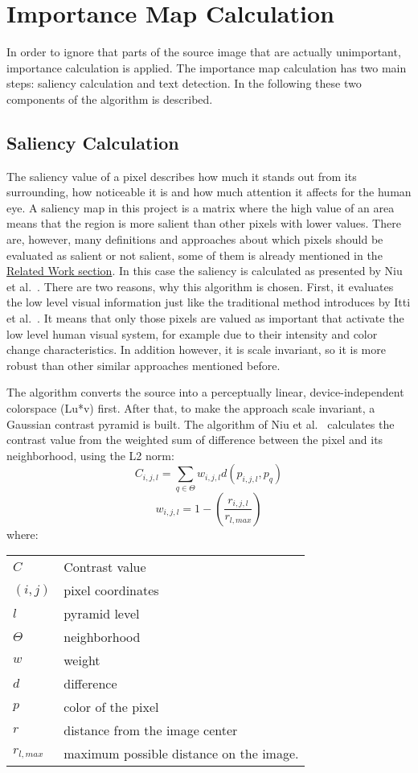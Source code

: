 \documentclass[draft,final]{vutinfth} %
\makeatletter
\newenvironment{conditions}
{\par\vspace{\abovedisplayskip}\noindent\begin{tabular}{>{$}l<{$} @{${}:{}$} l}}
	{\end{tabular}\par\vspace{\belowdisplayskip}}
\makeatother
\begin{document}
	\section{Importance Map Calculation}
	In order to ignore that parts of the source image that are actually unimportant, importance calculation is applied.
	The importance map calculation has two main steps: saliency calculation and text detection.
	In the following these two components of the algorithm is described.
	\subsection{Saliency Calculation}
	The saliency value of a pixel describes how much it stands out from its surrounding, how noticeable it is and how much attention it affects for the human eye.
	A saliency map in this project is a matrix where the high value of an area means that the region is more salient than other pixels with lower values.
	There are, however, many definitions and approaches about which pixels should be evaluated as salient or not salient, some of them is already mentioned in the \hyperref[relatedWork:resampling]{Related Work section}.
	In this case the saliency is calculated as presented by Niu et al.~\cite{niu2012image}. 
	There are two reasons, why this algorithm is chosen.
	First, it evaluates the low level visual information just like the traditional method introduces by Itti et al.~\cite{itti1998model}.
	It means that only those pixels are valued as important that activate the low level human visual system, for example due to their intensity and color change characteristics.
	In addition however, it is scale invariant, so it is more robust than other similar approaches mentioned before.\par 
	The algorithm converts the source into a perceptually linear, device-independent colorspace (Lu*v) first.
	After that, to make the approach scale invariant, a Gaussian contrast pyramid is built.
	The algorithm of Niu et al.~\cite{niu2012image} calculates the contrast value from the weighted sum of difference between the pixel and its neighborhood, using the L2 norm:	
	\[ C_{i,j,l}=\sum\limits_{q\in\Theta}w_{i,j,l}d(p_{i,j,l},p_{q}) \]
	\[ w_{i,j,l}=1-\left(\frac{r_{i,j,l}}{r_{l,max}}\right) \]
	where:
	\begin{center}
		\begin{conditions}
			C & Contrast value \\
			(i, j) & pixel coordinates \\
			l & pyramid level \\
			\Theta & neighborhood \\
			w & weight \\
			d & difference \\
			p & color of the pixel \\
			r & distance from the image center \\
			r_{l, max} & maximum possible distance on the image.
		\end{conditions}
	\end{center}
\end{document}
